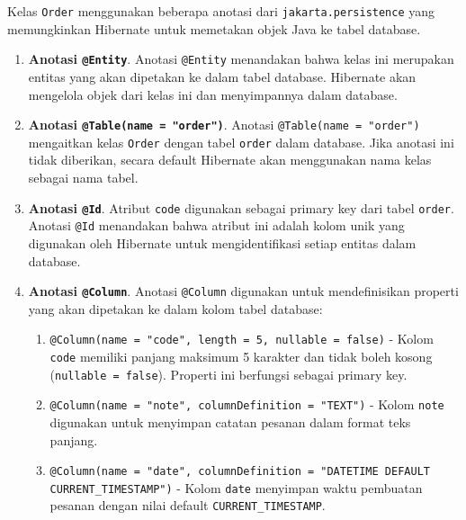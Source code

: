 Kelas \texttt{Order} menggunakan beberapa anotasi dari \texttt{jakarta.persistence} yang memungkinkan Hibernate untuk memetakan objek Java ke tabel database.

\begin{enumerate}
	\item \textbf{Anotasi \texttt{@Entity}}. 
	Anotasi \texttt{@Entity} menandakan bahwa kelas ini merupakan entitas yang akan dipetakan ke dalam tabel database. Hibernate akan mengelola objek dari kelas ini dan menyimpannya dalam database.
	
	\item \textbf{Anotasi \texttt{@Table(name = "order")}}. 
	Anotasi \texttt{@Table(name = "order")} mengaitkan kelas \texttt{Order} dengan tabel \texttt{order} dalam database. Jika anotasi ini tidak diberikan, secara default Hibernate akan menggunakan nama kelas sebagai nama tabel.
	
	\item \textbf{Anotasi \texttt{@Id}}. 
	Atribut \texttt{code} digunakan sebagai primary key dari tabel \texttt{order}. Anotasi \texttt{@Id} menandakan bahwa atribut ini adalah kolom unik yang digunakan oleh Hibernate untuk mengidentifikasi setiap entitas dalam database.
	
	\item \textbf{Anotasi \texttt{@Column}}.
	Anotasi \texttt{@Column} digunakan untuk mendefinisikan properti yang akan dipetakan ke dalam kolom tabel database:
	\begin{enumerate}
		\item \texttt{@Column(name = "code", length = 5, nullable = false)} - Kolom \texttt{code} memiliki panjang maksimum 5 karakter dan tidak boleh kosong (\texttt{nullable = false}). Properti ini berfungsi sebagai primary key.
		\item \texttt{@Column(name = "note", columnDefinition = "TEXT")} - Kolom \texttt{note} digunakan untuk menyimpan catatan pesanan dalam format teks panjang.
		\item \texttt{@Column(name = "date", columnDefinition = "DATETIME DEFAULT CURRENT\_TIMESTAMP")} - Kolom \texttt{date} menyimpan waktu pembuatan pesanan dengan nilai default \texttt{CURRENT\_TIMESTAMP}.
	\end{enumerate}
	

\end{enumerate}
